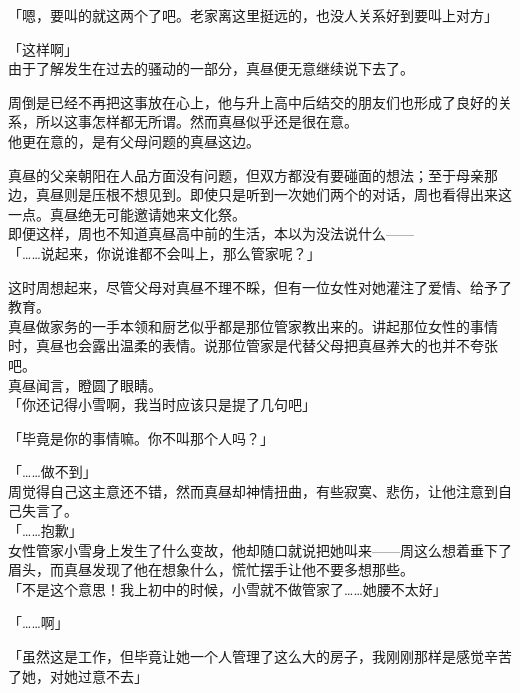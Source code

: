 「嗯，要叫的就这两个了吧。老家离这里挺远的，也没人关系好到要叫上对方」

「这样啊」\\

由于了解发生在过去的骚动的一部分，真昼便无意继续说下去了。

周倒是已经不再把这事放在心上，他与升上高中后结交的朋友们也形成了良好的关系，所以这事怎样都无所谓。然而真昼似乎还是很在意。\\

他更在意的，是有父母问题的真昼这边。

真昼的父亲朝阳在人品方面没有问题，但双方都没有要碰面的想法；至于母亲那边，真昼则是压根不想见到。即使只是听到一次她们两个的对话，周也看得出来这一点。真昼绝无可能邀请她来文化祭。\\

即便这样，周也不知道真昼高中前的生活，本以为没法说什么——\\

「……说起来，你说谁都不会叫上，那么管家呢？」

这时周想起来，尽管父母对真昼不理不睬，但有一位女性对她灌注了爱情、给予了教育。\\

真昼做家务的一手本领和厨艺似乎都是那位管家教出来的。讲起那位女性的事情时，真昼也会露出温柔的表情。说那位管家是代替父母把真昼养大的也并不夸张吧。\\

真昼闻言，瞪圆了眼睛。\\

「你还记得小雪啊，我当时应该只是提了几句吧」

「毕竟是你的事情嘛。你不叫那个人吗？」

「……做不到」\\

周觉得自己这主意还不错，然而真昼却神情扭曲，有些寂寞、悲伤，让他注意到自己失言了。\\

「……抱歉」\\

女性管家小雪身上发生了什么变故，他却随口就说把她叫来——周这么想着垂下了眉头，而真昼发现了他在想象什么，慌忙摆手让他不要多想那些。\\

「不是这个意思！我上初中的时候，小雪就不做管家了……她腰不太好」

「……啊」

「虽然这是工作，但毕竟让她一个人管理了这么大的房子，我刚刚那样是感觉辛苦了她，对她过意不去」\\

